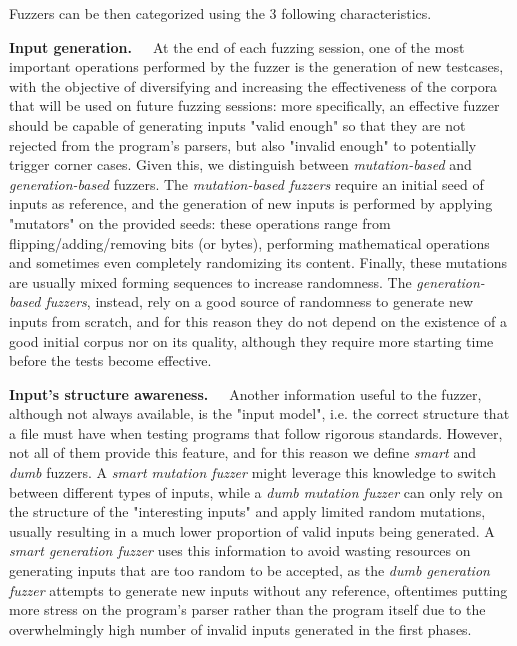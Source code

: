 Fuzzers can be then categorized using the 3 following characteristics.

\textbf{Input generation.}\ \ \  At the end of each fuzzing session, one of the most important operations performed by the fuzzer is the generation of new testcases, with the objective of diversifying and increasing the effectiveness of the corpora that will be used on future fuzzing sessions: more specifically, an effective fuzzer should be capable of generating inputs "valid enough" so that they are not rejected from the program's parsers, but also "invalid enough" to potentially trigger corner cases. Given this, we  distinguish between \textit{mutation-based} and \textit{generation-based} fuzzers. The \textit{mutation-based fuzzers} require an initial seed of inputs as reference, and the generation of new inputs is performed by applying "mutators" on the provided seeds: these operations range from flipping/adding/removing bits (or bytes), performing mathematical operations and sometimes even completely randomizing its content. Finally, these mutations are usually mixed forming sequences to increase randomness. The \textit{generation-based fuzzers}, instead, rely on a good source of randomness to generate new inputs from scratch, and for this reason they do not depend on the existence of a good initial corpus nor on its quality, although they require more starting time before the tests become effective.

\textbf{Input's structure awareness.}\ \ \ Another information useful to the fuzzer, although not always available, is the "input model", i.e. the correct structure that a file must have when testing programs that follow rigorous standards. However, not all of them provide this feature, and for this reason we define \textit{smart} and \textit{dumb} fuzzers.
A \textit{smart mutation fuzzer} might leverage this knowledge to switch between different types of inputs, while a \textit{dumb mutation fuzzer} can only rely on the structure of the "interesting inputs" and apply limited random mutations, usually resulting in a much lower proportion of valid inputs being generated.
A \textit{smart generation fuzzer} uses this information to avoid wasting resources on generating inputs that are too random to be accepted, as the \textit{dumb generation fuzzer} attempts to generate new inputs without any reference, oftentimes putting more stress on the program's parser rather than the program itself due to the overwhelmingly high number of invalid inputs generated in the first phases.

